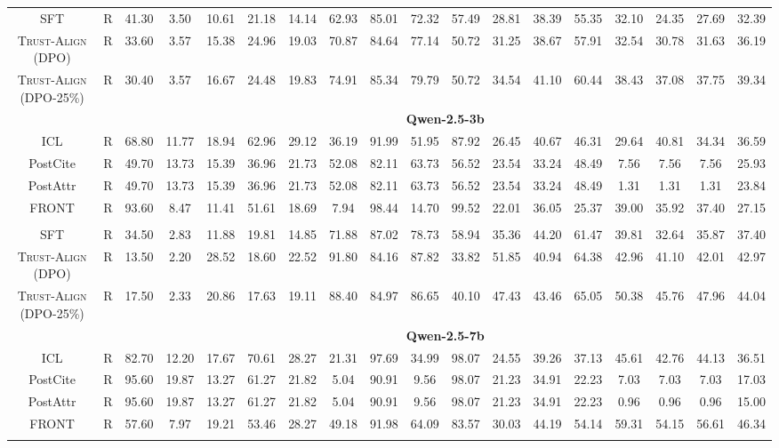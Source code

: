\documentclass{article} %
\newcommand{\method}[0]{\textsc{Trust-Align}}
\begin{document}
\begin{table}[htb!]
{\begin{tabular}{ccc*{15}c}
SFT & R & 41.30 & 3.50 & 10.61 & 21.18 & 14.14 & 62.93 & 85.01 & 72.32 & 57.49 & 28.81 & 38.39 & 55.35 & 32.10 & 24.35 & 27.69 & 32.39 \\
\method{} (DPO) & R & 33.60 & 3.57 & 15.38 & 24.96 & 19.03 & 70.87 & 84.64 & 77.14 & 50.72 & 31.25 & 38.67 & 57.91 & 32.54 & 30.78 & 31.63 & 36.19 \\
\method{} (DPO-25\%) & R & 30.40 & 3.57 & 16.67 & 24.48 & 19.83 & 74.91 & 85.34 & 79.79 & 50.72 & 34.54 & 41.10 & 60.44 & 38.43 & 37.08 & 37.75 & 39.34 \\ 

& & \multicolumn{16}{c}{\cellcolor[gray]{0.9}\textbf{Qwen-2.5-3b}} \\

ICL & R & 68.80 & 11.77 & 18.94 & 62.96 & 29.12 & 36.19 & 91.99 & 51.95 & 87.92 & 26.45 & 40.67 & 46.31 & 29.64 & 40.81 & 34.34 & 36.59 \\
PostCite & R & 49.70 & 13.73 & 15.39 & 36.96 & 21.73 & 52.08 & 82.11 & 63.73 & 56.52 & 23.54 & 33.24 & 48.49 & 7.56 & 7.56 & 7.56 & 25.93 \\
PostAttr & R & 49.70 & 13.73 & 15.39 & 36.96 & 21.73 & 52.08 & 82.11 & 63.73 & 56.52 & 23.54 & 33.24 & 48.49 & 1.31 & 1.31 & 1.31 & 23.84 \\
FRONT & R & 93.60 & 8.47 & 11.41 & 51.61 & 18.69 & 7.94 & 98.44 & 14.70 & 99.52 & 22.01 & 36.05 & 25.37 & 39.00 & 35.92 & 37.40 & 27.15 \\\\

SFT & R & 34.50 & 2.83 & 11.88 & 19.81 & 14.85 & 71.88 & 87.02 & 78.73 & 58.94 & 35.36 & 44.20 & 61.47 & 39.81 & 32.64 & 35.87 & 37.40 \\
\method{} (DPO) & R & 13.50 & 2.20 & 28.52 & 18.60 & 22.52 & 91.80 & 84.16 & 87.82 & 33.82 & 51.85 & 40.94 & 64.38 & 42.96 & 41.10 & 42.01 & 42.97 \\
\method{} (DPO-25\%) & R & 17.50 & 2.33 & 20.86 & 17.63 & 19.11 & 88.40 & 84.97 & 86.65 & 40.10 & 47.43 & 43.46 & 65.05 & 50.38 & 45.76 & 47.96 & 44.04 \\ 

& & \multicolumn{16}{c}{\cellcolor[gray]{0.9}\textbf{Qwen-2.5-7b}} \\
ICL & R & 82.70 & 12.20 & 17.67 & 70.61 & 28.27 & 21.31 & 97.69 & 34.99 & 98.07 & 24.55 & 39.26 & 37.13 & 45.61 & 42.76 & 44.13 & 36.51 \\
PostCite & R & 95.60 & 19.87 & 13.27 & 61.27 & 21.82 & 5.04 & 90.91 & 9.56 & 98.07 & 21.23 & 34.91 & 22.23 & 7.03 & 7.03 & 7.03 & 17.03 \\
PostAttr & R & 95.60 & 19.87 & 13.27 & 61.27 & 21.82 & 5.04 & 90.91 & 9.56 & 98.07 & 21.23 & 34.91 & 22.23 & 0.96 & 0.96 & 0.96 & 15.00 \\
FRONT & R & 57.60 & 7.97 & 19.21 & 53.46 & 28.27 & 49.18 & 91.98 & 64.09 & 83.57 & 30.03 & 44.19 & 54.14 & 59.31 & 54.15 & 56.61 & 46.34 \\\\


\end{tabular}}
\end{table}
\end{document}
